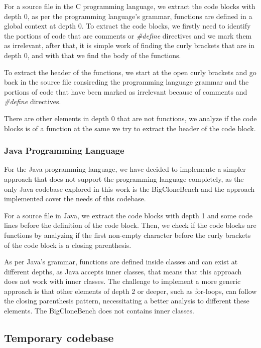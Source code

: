 For a source file in the C programming language, we extract the code blocks with depth 0, as per the programming 
language's grammar, functions are defined in a global context at depth 0. To extract the code blocks, we firstly need to 
identify the portions of code that are comments or \textit{\#define} directives and we mark them as irrelevant, after that, 
it is simple work of finding the curly brackets that are in depth 0, and with that we find the body of the functions. 

To extract the header of the functions, we start at the open curly brackets and go back in the source file consireding 
the programming language grammar  and the portions of code that have been marked as irrelevant because of comments and 
\textit{\#define} directives.

There are other elements in depth 0 that are not functions, we analyze if the code blocks is of a function at the same 
we try to extract the header of the code block.


\subsubsection{Java Programming Language}

For the Java programming language, we have decided to implemente a simpler approach that does not support 
the programming language completely, as the only Java codebase explored in this work is the BigCloneBench \citep{bigclonebench} and 
the approach implemented cover the needs of this codebase.

For a source file in Java, we extract the code blocks with depth 1 and some code lines before the definition of the code block. 
Then, we check if the code blocks are functions by analyzing if the first non-empty character before the curly brackets of 
the code block is a closing parenthesis. 

As per Java's grammar, functions are defined inside classes and can exist at different depths, as Java accepts inner classes, 
that means that this approach does not work with inner classes. The challenge to implement a more generic approach 
is that other elements of depth 2 or deeper, such as for-loops, can follow the closing parenthesis pattern, necessitating 
a better analysis to different these elements. The BigCloneBench \citep{bigclonebench} does not contains inner classes.

\subsection{Temporary codebase}

